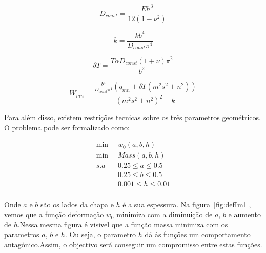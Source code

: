 \documentclass[a4paper,12pt]{article}
\begin{document}
\begin{equation}\label{eq:fo}
D_{const}=\frac{E h^3}{12\left(1-{\nu}^2\right)}
\end{equation}

\begin{equation}\label{eq:fo}
k=\frac{k b^4}{D_{const} {\pi}^4}
\end{equation}

\begin{equation}\label{eq:fo}
\delta T=\frac{T \alpha D_{const} \left(1+\nu\right) {\pi}^2}{b^2}
\end{equation}

\begin{equation}\label{eq:fo}
W_{mn}=\frac{\frac{b^4}{D_{const} {\pi}^4} \left(q_{mn}+\delta T \left(m^2 s^2+n^2\right)\right)}{{\left(m^2 s^2+n^2\right)}^2+k}
\end{equation}


Para além disso, existem restrições tecnicas sobre os três parametros geométricos. O problema pode ser formalizado como:

\begin{equation}\label{eq:prob}
\begin{split}
\min\;\; &w_{0}(a, b, h)\\
\min\;\; &Mass(a, b, h)\\
s.a\;\; & 0.25\leq a\leq 0.5\\
& 0.25\leq b\leq 0.5\\
& 0.001\leq h\leq 0.01\\
\end{split}
\end{equation}

Onde $a$ e $b$ são os lados da chapa e $h$ é a sua espessura. Na figura~\ref{fig:defIm1}, vemos que a função deformação $w_{0}$ minimiza com a diminuição de $a$, $b$ e aumento de $h$.Nessa mesma figura é visivel que a função massa minimiza com os parametros $a$, $b$ e $h$. Ou seja, o parametro $h$ dá às funções um comportamento antagónico.Assim, o objectivo será conseguir um compromisso entre estas funções.
\end{document}
